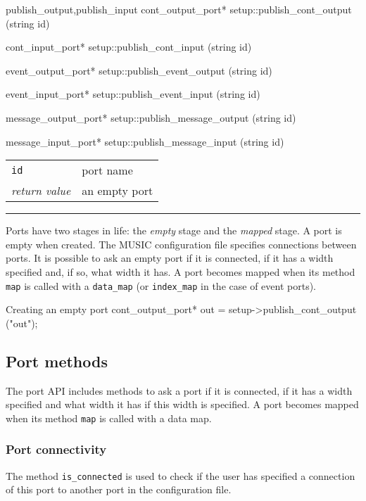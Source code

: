 \documentclass[a4paper]{report}
\makeatletter
\newenvironment{parameters}%
{\begin{tabular}{@{\hspace{2em}}lp{0.6\textwidth}}}%
{\end{tabular}\par\vspace{1mm}\par\hrule\par\vspace{5mm}}
\makeatother
\begin{document}
\begin{head}{publish_output,publish_input}
  cont_output_port* setup::publish_cont_output (string id)

  cont_input_port* setup::publish_cont_input (string id)

  event_output_port* setup::publish_event_output (string id)

  event_input_port* setup::publish_event_input (string id)

  message_output_port* setup::publish_message_output (string id)

  message_input_port* setup::publish_message_input (string id)
\end{head}
\begin{parameters}
  \lstinline|id| & port name \\
  \emph{return value} & an empty port \\
\end{parameters}

Ports have two stages in life: the \emph{empty} stage and the
\emph{mapped} stage.  A port is empty when created.  The MUSIC
configuration file specifies connections between ports.  It is
possible to ask an empty port if it is connected, if it has a width
specified and, if so, what width it has.  A port becomes mapped when
its method \lstinline|map| is called with a \lstinline|data_map| (or
\lstinline|index_map| in the case of event ports).

\begin{code}{Creating an empty port}
cont_output_port* out =
   setup->publish_cont_output ("out");
\end{code}

\subsection{Port methods}

The port API includes methods to ask a port if it is connected, if it
has a width specified and what width it has if this width is
specified.  A port becomes mapped when its method \lstinline|map| is
called with a data map.

\subsubsection{Port connectivity}

The method \lstinline|is_connected| is used to check if the user has
specified a connection of this port to another port in the
configuration file.
\end{document}
